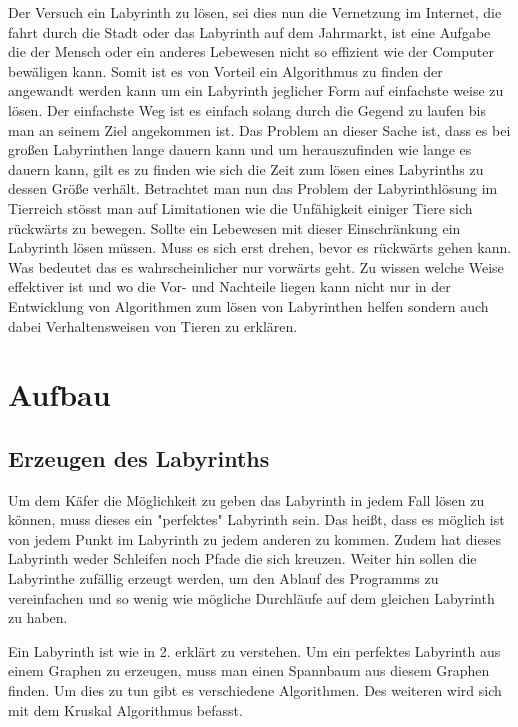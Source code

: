 \documentclass[12pt, a4paper, titlepage]{article}
\begin{document}
\bigskip

Der Versuch ein Labyrinth zu lösen, sei dies nun die Vernetzung im Internet, die fahrt durch die Stadt oder das Labyrinth auf dem Jahrmarkt, ist eine Aufgabe die der Mensch oder ein anderes Lebewesen nicht so effizient wie der Computer bewäligen kann.
Somit ist es von Vorteil ein Algorithmus zu finden der angewandt werden kann um ein Labyrinth jeglicher Form auf einfachste weise zu lösen. 
Der einfachste Weg ist es einfach solang durch die Gegend zu laufen bis man an seinem Ziel angekommen ist.
Das Problem an dieser Sache ist, dass es bei großen Labyrinthen lange dauern kann und um herauszufinden wie lange es dauern kann, gilt es zu finden wie sich die Zeit zum lösen eines Labyrinths zu dessen Größe verhält.
Betrachtet man nun das Problem der Labyrinthlösung im Tierreich stösst man auf Limitationen wie die Unfähigkeit einiger Tiere sich rückwärts zu bewegen. Sollte ein Lebewesen mit dieser Einschränkung ein Labyrinth lösen müssen. Muss es sich erst drehen, bevor es rückwärts gehen kann. Was bedeutet das es wahrscheinlicher nur vorwärts geht. Zu wissen welche Weise effektiver ist und wo die Vor- und Nachteile liegen kann nicht nur in der Entwicklung von Algorithmen zum lösen von Labyrinthen helfen sondern auch dabei Verhaltensweisen von Tieren zu erklären.


\newpage

\section{Aufbau}

\subsection{Erzeugen des Labyrinths}

Um dem Käfer die Möglichkeit zu geben das Labyrinth in jedem Fall lösen zu können, muss dieses ein "perfektes" Labyrinth sein.
Das heißt, dass es möglich ist von jedem Punkt im Labyrinth zu jedem anderen zu kommen.
Zudem hat dieses Labyrinth weder Schleifen noch Pfade die sich kreuzen.
Weiter hin sollen die Labyrinthe zufällig erzeugt werden, um den Ablauf des Programms zu vereinfachen und so wenig wie mögliche Durchläufe auf dem gleichen Labyrinth zu haben.

\bigskip

Ein Labyrinth ist wie in 2. erklärt zu verstehen.
Um ein perfektes Labyrinth aus einem Graphen zu erzeugen, muss man einen Spannbaum aus diesem Graphen finden.
Um dies zu tun gibt es verschiedene Algorithmen.
Des weiteren wird sich mit dem Kruskal Algorithmus befasst.
\end{document}
